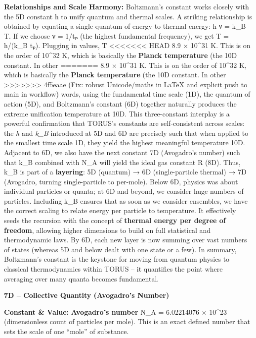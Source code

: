 \documentclass[]{article}
\begin{document}
\textbf{Relationships and Scale Harmony:} Boltzmann's constant works
closely with the 5D constant h to unify quantum and thermal scales. A
striking relationship is obtained by equating a single quantum of energy
to thermal energy: h ν = k\_B T. If we choose ν = 1/tₚ (the highest
fundamental frequency), we get T = h/(k\_B tₚ). Plugging in values, T \approx
<<<<<<< HEAD
8.9 × 10\^{}31 K\hspace{0pt}. This is on the order of 10\^{}32 K, which
is basically the \textbf{Planck temperature} (the 10D constant. In other
=======
8.9 × 10\^{}31 K​. This is on the order of 10\^{}32 K, which is
basically the \textbf{Planck temperature} (the 10D constant. In other
>>>>>>> 4f5eaae (Fix: robust Unicode/maths in LaTeX and explicit push to main in workflow)
words, using the fundamental time scale (1D), the quantum of action
(5D), and Boltzmann's constant (6D) together naturally produces the
extreme unification temperature at 10D. This three-constant interplay is
a powerful confirmation that TORUS's constants are self-consistent
across scales: the \emph{h} and \emph{k\_B} introduced at 5D and 6D are
precisely such that when applied to the smallest time scale 1D, they
yield the highest meaningful temperature 10D​. Adjacent to 6D, we also
have the next constant 7D (Avogadro's number) such that k\_B combined
with N\_A will yield the ideal gas constant R (8D)​. Thus, k\_B is part
of a \textbf{layering}: 5D (quantum) → 6D (single-particle thermal) → 7D
(Avogadro, turning single-particle to per-mole). Below 6D, physics was
about individual particles or quanta; at 6D and beyond, we consider huge
numbers of particles. Including k\_B ensures that as soon as we consider
ensembles, we have the correct scaling to relate energy per particle to
temperature. It effectively seeds the recursion with the concept of
\textbf{thermal energy per degree of freedom}, allowing higher
dimensions to build on full statistical and thermodynamic laws. By 6D,
each new layer is now summing over vast numbers of states (whereas 5D
and below dealt with one state or a few). In summary, Boltzmann's
constant is the keystone for moving from quantum physics to classical
thermodynamics within TORUS -- it quantifies the point where averaging
over many quanta becomes fundamental.

\textbf{7D -- Collective Quantity (Avogadro's Number)}

\textbf{Constant \& Value:} \textbf{Avogadro's number} N\_A = 6.02214076
× 10\^{}23 (dimensionless count of particles per mole)​. This is an
exact defined number that sets the scale of one ``mole'' of substance.
\end{document}
